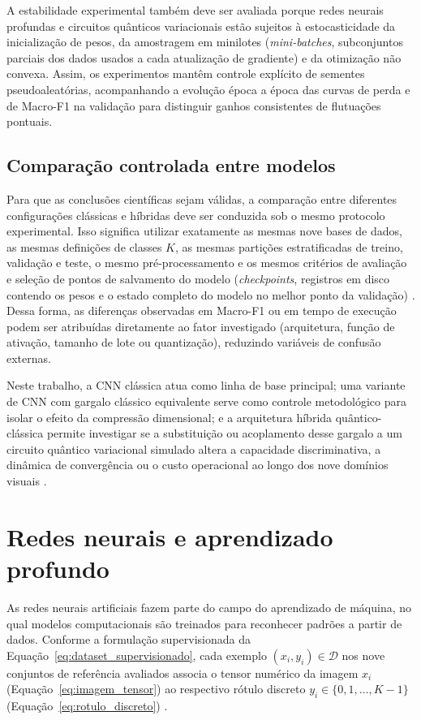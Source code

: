 \documentclass[
    12pt,
    openright,
    oneside,
    a4paper,
    english,
    brazil
]{abntex2}
\begin{document}
A estabilidade experimental também deve ser avaliada porque redes neurais profundas e circuitos quânticos variacionais estão sujeitos à estocasticidade da inicialização de pesos, da amostragem em minilotes (\textit{mini-batches}, subconjuntos parciais dos dados usados a cada atualização de gradiente) \cite{goodfellow2016deep} e da otimização não convexa. Assim, os experimentos mantêm controle explícito de sementes pseudoaleatórias, acompanhando a evolução época a época das curvas de perda e de Macro-F1 na validação para distinguir ganhos consistentes de flutuações pontuais.

\subsection{Comparação controlada entre modelos}
\label{subsec:comparacao_controlada_modelos}

Para que as conclusões científicas sejam válidas, a comparação entre diferentes configurações clássicas e híbridas deve ser conduzida sob o mesmo protocolo experimental. Isso significa utilizar exatamente as mesmas nove bases de dados, as mesmas definições de classes \(K\), as mesmas partições estratificadas de treino, validação e teste, o mesmo pré-processamento e os mesmos critérios de avaliação e seleção de pontos de salvamento do modelo (\textit{checkpoints}, registros em disco contendo os pesos e o estado completo do modelo no melhor ponto da validação) \cite{Wazlawick2020,paszke2019pytorch}. Dessa forma, as diferenças observadas em Macro-F1 ou em tempo de execução podem ser atribuídas diretamente ao fator investigado (arquitetura, função de ativação, tamanho de lote ou quantização), reduzindo variáveis de confusão externas.

Neste trabalho, a CNN clássica atua como linha de base principal; uma variante de CNN com gargalo clássico equivalente serve como controle metodológico para isolar o efeito da compressão dimensional; e a arquitetura híbrida quântico-clássica permite investigar se a substituição ou acoplamento desse gargalo a um circuito quântico variacional simulado altera a capacidade discriminativa, a dinâmica de convergência ou o custo operacional ao longo dos nove domínios visuais \cite{Wazlawick2020}.

\section{Redes neurais e aprendizado profundo}

As redes neurais artificiais fazem parte do campo do aprendizado de máquina, no qual modelos computacionais são treinados para reconhecer padrões a partir de dados. Conforme a formulação supervisionada da Equação~\eqref{eq:dataset_supervisionado}, cada exemplo \((x_i, y_i) \in \mathcal{D}\) nos nove conjuntos de referência avaliados associa o tensor numérico da imagem \(x_i\) (Equação~\eqref{eq:imagem_tensor}) ao respectivo rótulo discreto \(y_i \in \{0, 1, \dots, K-1\}\) (Equação~\eqref{eq:rotulo_discreto}) \cite{goodfellow2016deep,LeCun2015}.
\end{document}
